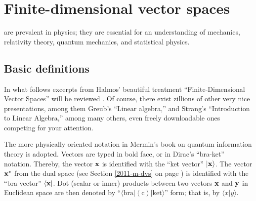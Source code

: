 \chapter{Finite-dimensional vector spaces}
\label{ch:lvs}

 are prevalent in physics;
they are essential for an understanding
of mechanics, relativity theory, quantum mechanics, and statistical physics.


\section{Basic definitions}

In what follows excerpts from Halmos' beautiful treatment
``Finite-Dimensional Vector Spaces'' will be reviewed \cite{halmos-vs}.
Of course, there exist zillions of other very nice presentations, among them
Greub's ``Linear algebra,'' and
Strang's ``Introduction to Linear Algebra,''
among many others, even freely downloadable  ones
\cite{Greub75,Strang:2009:ILA,Homes-rorres,lipschutz:schaul-la,Hefferon}
competing for your attention.


The more physically oriented notation in Mermin's book on
quantum information theory \cite{mermin-04,mermin-07} is adopted.
Vectors are typed in bold face, or in Dirac's ``bra-ket'' notation.
Thereby,
the vector ${\bf x}$ is identified with the ``ket vector'' $\vert {\bf x}\rangle$.
The vector ${\bf x}^\ast$  from the dual space (see Section \ref{2011-m-dvs} on page \pageref{2011-m-dvs})
 is identified with the ``bra vector'' $\langle {\bf x}\vert$.
Dot (scalar or inner) products between two vectors ${\bf x}$ and ${\bf y}$   in Euclidean space are then
denoted by ``$\langle \textrm{bra} \vert  (\textrm{c}) \vert \textrm{ket}  \rangle$''  form;
that is, by $\langle x \vert  y  \rangle$.

